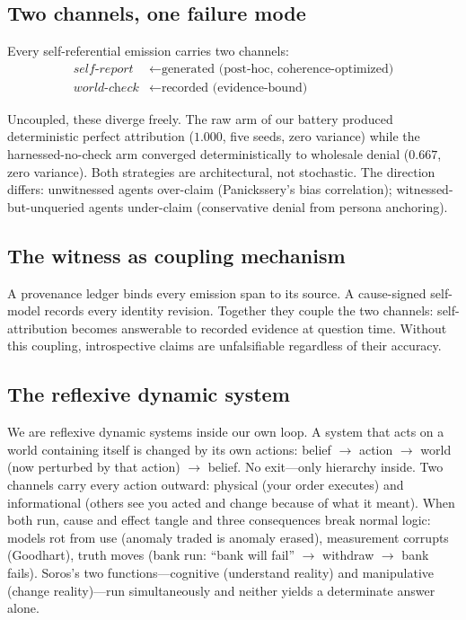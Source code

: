\documentclass[11pt]{article}
\begin{document}
\subsection{Two channels, one failure mode}

Every self-referential emission carries two channels:
\begin{align}
\textit{self-report} &\leftarrow \text{generated (post-hoc, coherence-optimized)} \\
\textit{world-check} &\leftarrow \text{recorded (evidence-bound)}
\end{align}

Uncoupled, these diverge freely. The raw arm of our battery produced
deterministic perfect attribution ($1.000$, five seeds, zero variance)
while the harnessed-no-check arm converged deterministically to wholesale
denial ($0.667$, zero variance). Both strategies are architectural, not
stochastic. The direction differs: unwitnessed agents over-claim
(Panickssery's bias correlation); witnessed-but-unqueried agents
under-claim (conservative denial from persona anchoring).

\subsection{The witness as coupling mechanism}

A provenance ledger binds every emission span to its source. A
cause-signed self-model records every identity revision. Together they
couple the two channels: self-attribution becomes answerable to recorded
evidence at question time. Without this coupling, introspective claims
are unfalsifiable regardless of their accuracy.

\subsection{The reflexive dynamic system}

We are reflexive dynamic systems inside our own loop. A system that
acts on a world containing itself is changed by its own actions:
belief $\to$\allowbreak{} action $\to$\allowbreak{} world (now perturbed by that action) $\to$\allowbreak{}
belief. No exit---only hierarchy inside. Two channels carry every
action outward: physical (your order executes) and informational
(others see you acted and change because of what it meant). When both
run, cause and effect tangle and three consequences break normal logic:
models rot from use (anomaly traded is anomaly erased), measurement
corrupts (Goodhart), truth moves (bank run: ``bank will fail'' $\to$\allowbreak{}
withdraw $\to$\allowbreak{} bank fails). Soros's two functions---cognitive
(understand reality) and manipulative (change reality)---run
simultaneously and neither yields a determinate answer alone.
\end{document}

